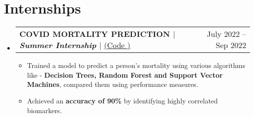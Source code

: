 \documentclass[12pt, a4paper]{article}
\makeatletter
\newcommand{\resumeItem}[1]{
  \item\small{
    {#1 \vspace{-2pt}}
  }
}
\newcommand{\resumeProjectHeading}[2]{
    \item
    \begin{tabular*}{0.97\textwidth}{l@{\extracolsep{\fill}}r}
      \small#1 & #2 \\
    \end{tabular*}\vspace{-6pt}
}
\newcommand{\resumeSubHeadingListStart}{\begin{itemize}[leftmargin=0.15in, label={}]}
\newcommand{\resumeSubHeadingListEnd}{\end{itemize}}
\newcommand{\resumeItemListStart}{\begin{itemize}}
\newcommand{\resumeItemListEnd}{\end{itemize}\vspace{-6pt}}
\makeatother
\begin{document}
\section{Internships}
  \resumeSubHeadingListStart
      \resumeProjectHeading
          {\textbf{COVID MORTALITY PREDICTION $|$ \emph{Summer Internship} $|$}
          \href{https://github.com/GSK-10/Covid_Mortality_Prediction}{({Code} \faExternalLink*)
            }
          }{July 2022 -- Sep 2022}
          \resumeItemListStart
            \resumeItem{Trained a model to predict a person's mortality using various algorithms like - \textbf{Decision Trees, Random Forest and Support Vector Machines}, compared them using performance measures.}
            \resumeItem{Achieved an \textbf{accuracy of 90\%} by identifying highly correlated biomarkers.}
          \resumeItemListEnd
    \resumeSubHeadingListEnd

\end{document}
